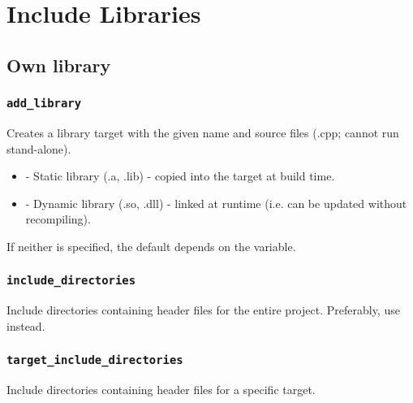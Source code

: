 \vspace{3cm}
\section{Include Libraries} \label{s:include_libraries}



\subsection{Own library}

\subsubsection{\texttt{add\_library}}
\begin{center}  \end{center}
Creates a library target with the given name and source files (.cpp; cannot run stand-alone). 
\begin{itemize}
    \item {} - Static library (.a, .lib) - copied into the target at build time.
    \item {} - Dynamic library (.so, .dll) - linked at runtime (i.e. can be updated without recompiling).
\end{itemize}
If neither is specified, the default depends on the  variable.

\subsubsection{\texttt{include\_directories}}
\begin{center}  \end{center}
Include directories containing header files for the entire project. Preferably, use  instead.

\subsubsection{\texttt{target\_include\_directories}}
\begin{center}  \end{center}
Include directories containing header files for a specific target.


